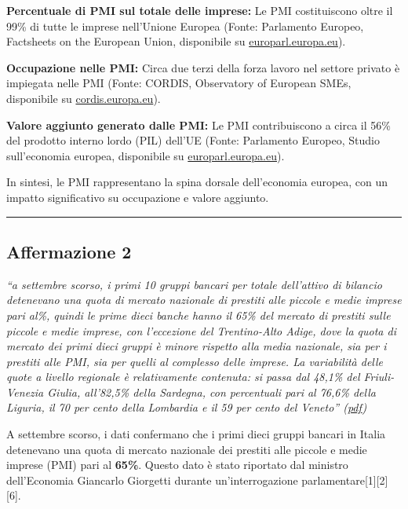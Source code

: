 \documentclass[
  letterpaper,
  DIV=11,
  numbers=noendperiod]{scrartcl}
\begin{document}
\textbf{Percentuale di PMI sul totale delle imprese:} Le PMI
costituiscono oltre il 99\% di tutte le imprese nell'Unione Europea
(Fonte: Parlamento Europeo, Factsheets on the European Union,
disponibile su
\href{https://www.europarl.europa.eu/factsheets/it/sheet/63/piccole-e-medie-imprese}{europarl.europa.eu}).

\textbf{Occupazione nelle PMI:} Circa due terzi della forza lavoro nel
settore privato è impiegata nelle PMI (Fonte: CORDIS, Observatory of
European SMEs, disponibile su
\href{https://cordis.europa.eu/article/id/18356-observatory-of-european-smes-publishes-first-three-reports}{cordis.europa.eu}).

\textbf{Valore aggiunto generato dalle PMI:} Le PMI contribuiscono a
circa il 56\% del prodotto interno lordo (PIL) dell'UE (Fonte:
Parlamento Europeo, Studio sull'economia europea, disponibile su
\href{https://www.europarl.europa.eu/RegData/etudes/ATAG/2021/690633/EPRS_ATA\%282021\%29690633_IT.pdf}{europarl.europa.eu}).

In sintesi, le PMI rappresentano la spina dorsale dell'economia europea,
con un impatto significativo su occupazione e valore aggiunto.

\begin{center}\rule{0.5\linewidth}{0.5pt}\end{center}

\subsection{Affermazione 2}\label{affermazione-2}

\emph{``a settembre scorso, i primi 10 gruppi bancari per totale
dell'attivo di bilancio detenevano una quota di mercato nazionale di
prestiti alle piccole e medie imprese pari al\%, quindi le prime dieci
banche hanno il 65\% del mercato di prestiti sulle piccole e medie
imprese, con l'eccezione del Trentino-Alto Adige, dove la quota di
mercato dei primi dieci gruppi è minore rispetto alla media nazionale,
sia per i prestiti alle PMI, sia per quelli al complesso delle imprese.
La variabilità delle quote a livello regionale è relativamente
contenuta: si passa dal 48,1\% del Friuli-Venezia Giulia, all'82,5\%
della Sardegna, con percentuali pari al 76,6\% della Liguria, il 70 per
cento della Lombardia e il 59 per cento del Veneto''
(\href{zotero://open-pdf/library/items/B4RMZ7B3?page=1&annotation=T4DLE8D4}{pdf})}

A settembre scorso, i dati confermano che i primi dieci gruppi bancari
in Italia detenevano una quota di mercato nazionale dei prestiti alle
piccole e medie imprese (PMI) pari al \textbf{65\%}. Questo dato è stato
riportato dal ministro dell'Economia Giancarlo Giorgetti durante
un'interrogazione parlamentare{[}1{]}{[}2{]}{[}6{]}.
\end{document}
